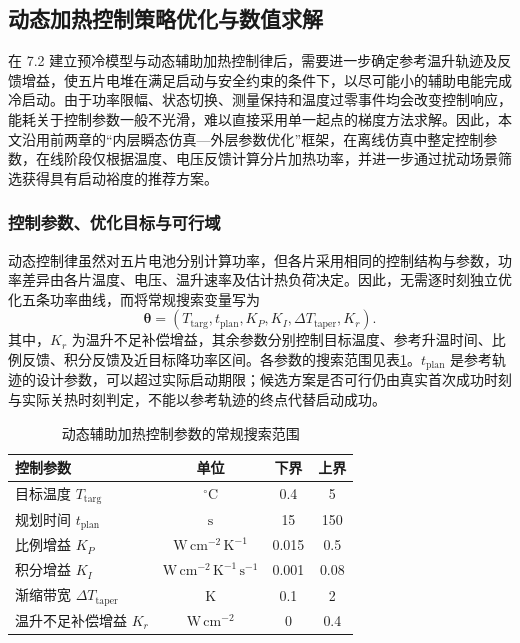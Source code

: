 \subsection{动态加热控制策略优化与数值求解}
在 7.2 建立预冷模型与动态辅助加热控制律后，需要进一步确定参考温升轨迹及反馈增益，使五片电堆在满足启动与安全约束的条件下，以尽可能小的辅助电能完成冷启动。由于功率限幅、状态切换、测量保持和温度过零事件均会改变控制响应，能耗关于控制参数一般不光滑，难以直接采用单一起点的梯度方法求解。因此，本文沿用前两章的“内层瞬态仿真—外层参数优化”框架，在离线仿真中整定控制参数，在线阶段仅根据温度、电压反馈计算分片加热功率，并进一步通过扰动场景筛选获得具有启动裕度的推荐方案。

\subsubsection{控制参数、优化目标与可行域}
动态控制律虽然对五片电池分别计算功率，但各片采用相同的控制结构与参数，功率差异由各片温度、电压、温升速率及估计热负荷决定。因此，无需逐时刻独立优化五条功率曲线，而将常规搜索变量写为
\begin{equation}
\boldsymbol{\theta}=\left(T_{\mathrm{targ}},t_{\mathrm{plan}},K_P,K_I,\Delta T_{\mathrm{taper}},K_r\right).
\tag{7-@@1@@}\label{eq:q4:solver_parameters}
\end{equation}
其中，\(K_r\) 为温升不足补偿增益，其余参数分别控制目标温度、参考升温时间、比例反馈、积分反馈及近目标降功率区间。各参数的搜索范围见表\ref{B7-control-bounds}。\(t_{\mathrm{plan}}\) 是参考轨迹的设计参数，可以超过实际启动期限；候选方案是否可行仍由真实首次成功时刻与实际关热时刻判定，不能以参考轨迹的终点代替启动成功。

\begin{table}[htbp]
    \centering
    \caption{动态辅助加热控制参数的常规搜索范围}
    \label{B7-control-bounds}
    \renewcommand{\arraystretch}{1.5}
    \begin{tabular}{l c c c}
        \toprule
        控制参数 & 单位 & 下界 & 上界 \\
        \midrule
        目标温度 \(T_{\mathrm{targ}}\) & \(^\circ\mathrm C\) & 0.4 & 5 \\
        规划时间 \(t_{\mathrm{plan}}\) & \(\mathrm s\) & 15 & 150 \\
        比例增益 \(K_P\) & \(\mathrm{W\,cm^{-2}\,K^{-1}}\) & 0.015 & 0.5 \\
        积分增益 \(K_I\) & \(\mathrm{W\,cm^{-2}\,K^{-1}\,s^{-1}}\) & 0.001 & 0.08 \\
        渐缩带宽 \(\Delta T_{\mathrm{taper}}\) & \(\mathrm K\) & 0.1 & 2 \\
        温升不足补偿增益 \(K_r\) & \(\mathrm{W\,cm^{-2}}\) & 0 & 0.4 \\
        \bottomrule
    \end{tabular}
\end{table}

